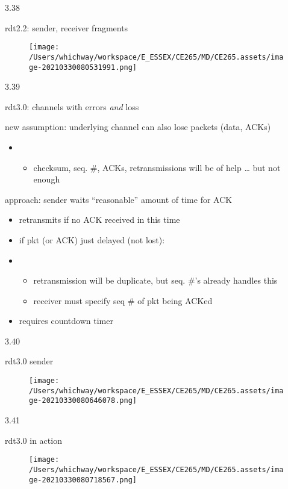 \documentclass[
]{article}
\begin{document}
3.38

rdt2.2: sender, receiver fragments

\begin{figure}
\centering
\texttt{[image: /Users/whichway/workspace/E\_ESSEX/CE265/MD/CE265.assets/image-20210330080531991.png]}
\caption{}
\end{figure}

3.39

rdt3.0: channels with errors \emph{and} loss

new assumption: underlying channel can also lose packets (data, ACKs)

\begin{itemize}
\item
  \begin{itemize}
  \item
    checksum, seq. \#, ACKs, retransmissions will be of help \ldots{}
    but not enough
  \end{itemize}
\end{itemize}

approach: sender waits ``reasonable'' amount of time for ACK

\begin{itemize}
\item
  retransmits if no ACK received in this time
\item
  if pkt (or ACK) just delayed (not lost):
\item
  \begin{itemize}
  \item
    retransmission will be duplicate, but seq. \#'s already handles this
  \item
    receiver must specify seq \# of pkt being ACKed
  \end{itemize}
\item
  requires countdown timer
\end{itemize}

3.40

rdt3.0 sender

\begin{figure}
\centering
\texttt{[image: /Users/whichway/workspace/E\_ESSEX/CE265/MD/CE265.assets/image-20210330080646078.png]}
\caption{}
\end{figure}

3.41

rdt3.0 in action

\begin{figure}
\centering
\texttt{[image: /Users/whichway/workspace/E\_ESSEX/CE265/MD/CE265.assets/image-20210330080718567.png]}
\caption{}
\end{figure}
\end{document}
